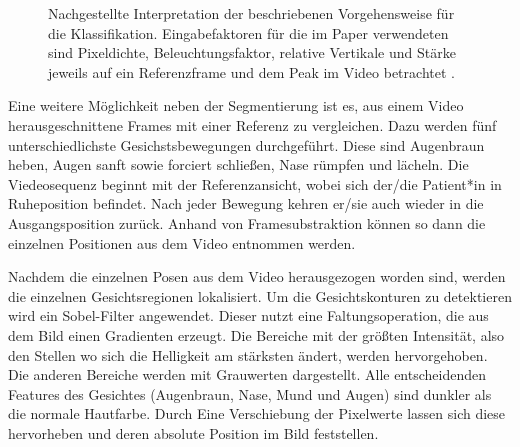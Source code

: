 \begin{figure}[!t]
\caption[Nachgestellte Interpretation der beschriebenen Vorgehensweise für die Klassifikation]{Nachgestellte Interpretation der beschriebenen Vorgehensweise für die Klassifikation. Eingabefaktoren für die im Paper verwendeten sind Pixeldichte, Beleuchtungsfaktor, relative Vertikale und Stärke jeweils auf ein Referenzframe und dem Peak im Video betrachtet \cite{detection_fp1}.}\label{cap:paper_2}
\end{figure}\label{fig:paper_2}


Eine weitere Möglichkeit neben der Segmentierung ist es, aus einem Video herausgeschnittene Frames mit einer Referenz zu vergleichen. Dazu werden fünf unterschiedlichste Gesichstsbewegungen durchgeführt. Diese sind Augenbraun heben, Augen sanft sowie forciert schließen, Nase rümpfen und lächeln. Die Viedeosequenz beginnt mit der Referenzansicht, wobei sich der/die Patient*in in Ruheposition befindet. Nach jeder Bewegung kehren er/sie auch wieder in die Ausgangsposition zurück. Anhand von Framesubstraktion können so dann die einzelnen Positionen aus dem Video entnommen werden.

Nachdem die einzelnen Posen aus dem Video herausgezogen worden sind, werden die einzelnen Gesichtsregionen lokalisiert. Um die Gesichtskonturen zu detektieren wird ein Sobel-Filter angewendet. Dieser nutzt eine Faltungsoperation, die aus dem Bild einen Gradienten erzeugt. Die Bereiche mit der größten Intensität, also den Stellen wo sich die Helligkeit am stärksten ändert, werden hervorgehoben. Die anderen Bereiche werden mit Grauwerten dargestellt. Alle entscheidenden Features des Gesichtes (Augenbraun, Nase, Mund und Augen) sind dunkler als die normale Hautfarbe. Durch Eine Verschiebung der Pixelwerte lassen sich diese hervorheben und deren absolute Position im Bild feststellen.

